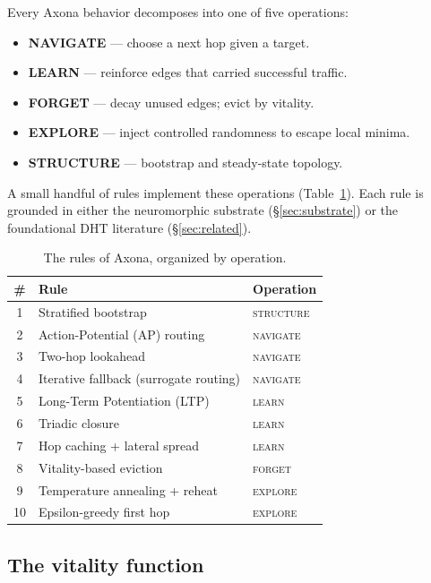 \documentclass[conference]{IEEEtran}
\newcommand{\axona}{Axona\xspace}
\begin{document}
Every \axona behavior decomposes into one of five operations:

\begin{itemize}
\item \textbf{NAVIGATE} --- choose a next hop given a target.
\item \textbf{LEARN} --- reinforce edges that carried successful
  traffic.
\item \textbf{FORGET} --- decay unused edges; evict by vitality.
\item \textbf{EXPLORE} --- inject controlled randomness to escape
  local minima.
\item \textbf{STRUCTURE} --- bootstrap and steady-state topology.
\end{itemize}

A small handful of rules implement these operations
(Table~\ref{tab:rules}).  Each rule is grounded in either the
neuromorphic substrate (\S\ref{sec:substrate}) or the foundational
DHT literature (\S\ref{sec:related}).

\begin{table}[t]
\centering
\caption{The rules of \axona, organized by operation.}
\label{tab:rules}
\small
\begin{tabular}{@{}cp{}p{}@{}}
\toprule
\textbf{\#} & \textbf{Rule} & \textbf{Operation} \\
\midrule
1 & Stratified bootstrap & \textsc{structure} \\
2 & Action-Potential (AP) routing & \textsc{navigate} \\
3 & Two-hop lookahead & \textsc{navigate} \\
4 & Iterative fallback (surrogate routing) & \textsc{navigate} \\
5 & Long-Term Potentiation (LTP) & \textsc{learn} \\
6 & Triadic closure & \textsc{learn} \\
7 & Hop caching + lateral spread & \textsc{learn} \\
8 & Vitality-based eviction & \textsc{forget} \\
9 & Temperature annealing + reheat & \textsc{explore} \\
10 & Epsilon-greedy first hop & \textsc{explore} \\
\bottomrule
\end{tabular}
\end{table}

\subsection{The vitality function}
\label{sec:axona-vitality}
\end{document}

